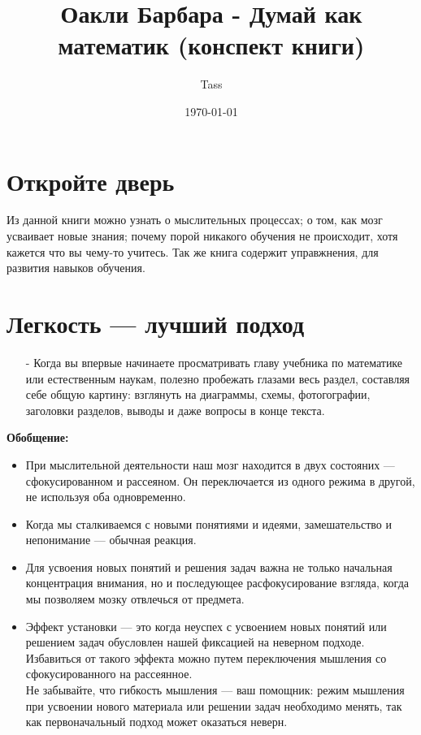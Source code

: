 \documentclass{article}
\begin{document}
\title{Оакли Барбара - Думай как математик (конспект книги)}
\author{Tass}
\date{\today}
\maketitle

\newpage
\section{Откройте дверь}
Из данной книги можно узнать о мыслительных процессах; о том, как мозг усваивает новые знания; почему порой никакого обучения не происходит, хотя кажется что вы чему-то учитесь. Так же книга содержит управжнения, для развития навыков обучения.

\section{Легкость --- лучший подход}
\begin{itemize}
\item[-] Когда вы впервые начинаете просматривать главу учебника по математике или естественным наукам, полезно пробежать глазами весь раздел, составляя себе общую картину: взглянуть на диаграммы, схемы, фотогографии, заголовки разделов, выводы и даже вопросы в конце текста.
\end{itemize}
\textbf{Обобщение:}
\begin{itemize}
\item При мыслительной деятельности наш мозг находится в двух состояних --- сфокусированном и рассеяном. Он переключается из одного режима в другой, не используя оба одновременно.
\item Когда мы сталкиваемся с новыми понятиями и идеями, замешательство и непонимание --- обычная реакция.
\item Для усвоения новых понятий и решения задач важна не только начальная концентрация внимания, но и последующее расфокусирование взгляда, когда мы позволяем мозку отвлечься от предмета.
\item Эффект установки --- это когда неуспех с усвоением новых понятий или решением задач обусловлен нашей фиксацией на неверном подходе. Избавиться от такого эффекта можно путем переключения мышления со сфокусированного на рассеянное.\\Не забывайте, что гибкость мышления --- ваш помощник: режим мышления при усвоении нового материала или решении задач необходимо менять, так как первоначальный подход может оказаться неверн.
\end{itemize}
\end{document}
